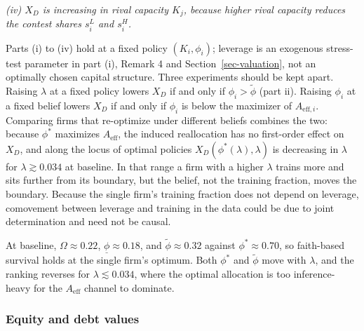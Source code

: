 \documentclass[
  11pt,
  letterpaper,
]{scrartcl}
\begin{document}
\emph{(iv) \(X_D\) is increasing in rival capacity \(K_j\), because
higher rival capacity reduces the contest shares \(s_i^L\) and
\(s_i^H\).}

Parts (i) to (iv) hold at a fixed policy \((K_i, \phi_i)\); leverage is
an exogenous stress-test parameter in part (i), Remark 4 and
Section~\ref{sec-valuation}, not an optimally chosen capital structure.
Three experiments should be kept apart. Raising \(\lambda\) at a fixed
policy lowers \(X_D\) if and only if \(\phi_i > \tilde{\phi}\) (part
ii). Raising \(\phi_i\) at a fixed belief lowers \(X_D\) if and only if
\(\phi_i\) is below the maximizer of \(A_{\text{eff},i}\). Comparing
firms that re-optimize under different beliefs combines the two: because
\(\phi^*\) maximizes \(A_{\text{eff}}\), the induced reallocation has no
first-order effect on \(X_D\), and along the locus of optimal policies
\(X_D(\phi^*(\lambda), \lambda)\) is decreasing in \(\lambda\) for
\(\lambda \gtrsim 0.034\) at baseline. In that range a firm with a
higher \(\lambda\) trains more and sits further from its boundary, but
the belief, not the training fraction, moves the boundary. Because the
single firm's training fraction does not depend on leverage, comovement
between leverage and training in the data could be due to joint
determination and need not be causal.

At baseline, \(\Omega \approx 0.22\), \(\underline{\phi} \approx 0.18\),
and \(\tilde{\phi} \approx 0.32\) against \(\phi^* \approx 0.70\), so
faith-based survival holds at the single firm's optimum. Both \(\phi^*\)
and \(\tilde{\phi}\) move with \(\lambda\), and the ranking reverses for
\(\lambda \lesssim 0.034\), where the optimal allocation is too
inference-heavy for the \(A_{\text{eff}}\) channel to dominate.

\subsubsection{Equity and debt values}\label{equity-and-debt-values}
\end{document}
